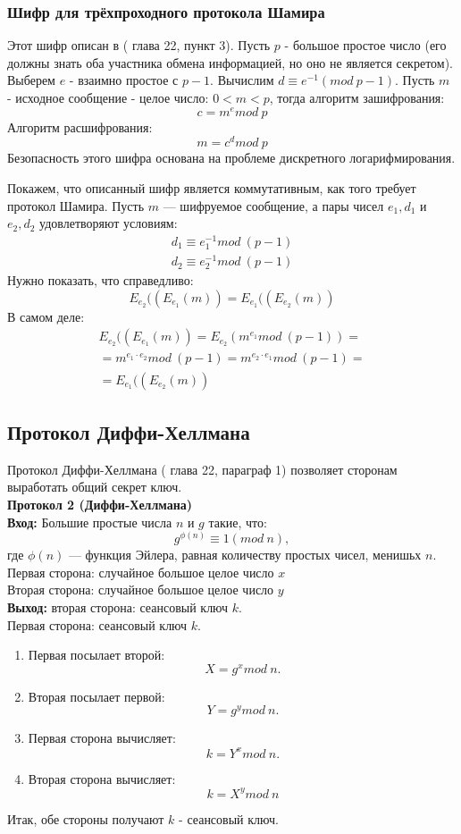 \subsubsection{Шифр для трёхпроходного протокола Шамира}
Этот шифр описан в (\cite{Shnayer} глава 22, пункт 3). Пусть $p$ - большое простое число (его должны знать оба участника обмена информацией, но оно не является секретом). Выберем $e$ - взаимно простое с $p-1$. Вычислим $d \equiv e^{-1}(mod\ p-1)$. Пусть $m$ - исходное сообщение - целое число: $0<m<p$, тогда алгоритм зашифрования:
$$c=m^{e}mod\ p$$
Алгоритм расшифрования:
$$m=c^{d}mod\ p$$
Безопасность этого шифра основана на проблеме дискретного логарифмирования.

Покажем, что описанный шифр является коммутативным, как того требует протокол Шамира. Пусть $m$ --- шифруемое сообщение, а пары чисел $e_{1}, d_{1}$ и $e_{2}, d_{2}$ удовлетворяют условиям:
\begin{gather*}
	d_{1} \equiv e_{1}^{-1}mod\ (p-1)\\
	d_{2} \equiv e_{2}^{-1}mod\ (p-1)
\end{gather*}
Нужно показать, что справедливо:
$$
E_{e_{2}}((E_{e_{1}}(m)) = E_{e_{1}}((E_{e_{2}}(m))
$$
В самом деле:
\begin{gather*}
E_{e_{2}}((E_{e_{1}}(m)) = E_{e_{2}}(m^{e_{1}}mod\ (p-1))=\\
=m^{e_{1}\cdot{}e_{2}}mod\ (p-1) = m^{e_{2}\cdot{}e_{1}}mod\ (p-1)=\\
 = E_{e_{1}}((E_{e_{2}}(m))
\end{gather*}
\subsection{Протокол Диффи-Хеллмана}
Протокол Диффи-Хеллмана (\autocite{Shnayer} глава 22, параграф 1) позволяет сторонам выработать общий секрет ключ.\\
\textbf{Протокол 2 (Диффи-Хеллмана)}\\
\hspace*{10mm}\textbf{Вход:} Большие простые числа $n$ и $g$ такие, что:
$$g^{\phi(n)}\equiv1(mod\ n),$$
где $\phi(n)$ --- функция Эйлера, равная количеству простых чисел, менишьх $n$.\\
Первая сторона: случайное большое целое число $x$\\
Вторая сторона: случайное большое целое число $y$\\
\hspace*{10mm}\textbf{Выход:} вторая сторона: сеансовый ключ $k$.\\
\hspace*{10mm}Первая сторона: сеансовый ключ $k$.
\begin{enumerate}
	\item Первая посылает второй:
	$$X = g^{x}mod\ n.$$
	\item Вторая посылает первой:
	$$Y = g^{y}mod\ n.$$
	\item Первая сторона вычисляет:
	$$k = Y^{x}mod\ n.$$
	\item Вторая сторона вычисляет:
	$$k = X^{y}mod\ n$$
\end{enumerate}
Итак, обе стороны получают $k$ - сеансовый ключ.
